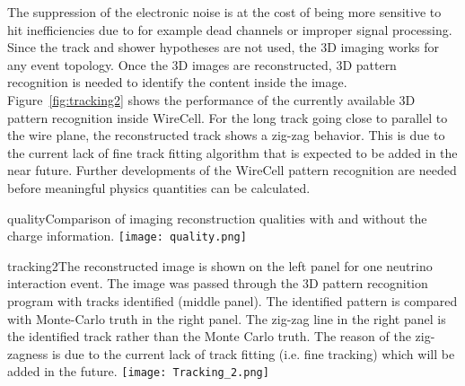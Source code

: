 The suppression of the electronic noise is at the cost of being more
sensitive to hit inefficiencies due to for example dead channels or improper signal processing.
 Since the track and shower hypotheses
are not used, the 3D imaging works for any event topology. Once the 3D
images are reconstructed, 3D pattern recognition is needed to identify 
the content inside the image. Figure~\ref{fig:tracking2} shows the 
performance of the currently available 3D pattern recognition inside
WireCell. For the long track going close to parallel to the wire plane, the reconstructed
track shows a zig-zag behavior. This is due to the current lack of fine track fitting algorithm
that is expected to be added in the near future. 
Further developments of the WireCell pattern recognition 
are needed before meaningful physics quantities can be calculated.
%
\begin{cdrfigure}{quality}{Comparison of imaging reconstruction 
qualities with and without the charge information. }
\texttt{[image: quality.png]}
\end{cdrfigure}
%
%
\begin{cdrfigure}{tracking2}{The reconstructed image is shown 
on the left panel for one neutrino interaction event. The image 
was passed through the 3D pattern recognition program with tracks 
identified (middle panel). The identified pattern is compared 
with Monte-Carlo truth in the right panel. The zig-zag line in the right 
panel is the identified track rather than the Monte Carlo truth. 
The reason of the zig-zagness is due to the current lack of track fitting 
(i.e. fine tracking) which will be added in the future. }
 \texttt{[image: Tracking\_2.png]}
\end{cdrfigure}


